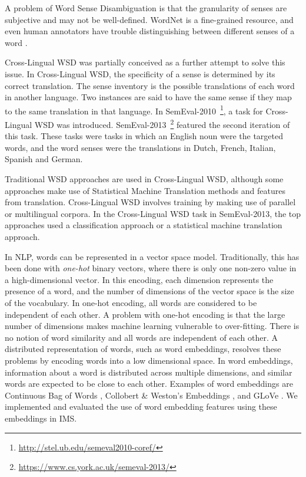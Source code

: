 \documentclass[11pt]{article}
\begin{document}
A problem of Word Sense Disambiguation is that the granularity of senses are subjective and may not be well-defined. WordNet is a fine-grained resource, and even human annotators have trouble distinguishing between different senses of a word \cite{edmonds2002introduction}. 

Cross-Lingual WSD was partially conceived as a further attempt to solve this issue. In Cross-Lingual WSD, the specificity of a sense is determined by its correct translation. The sense inventory is the possible translations of each word in another language. Two instances are said to have the same sense if they map to the same translation in that language. In SemEval-2010~\footnote{\url{http://stel.ub.edu/semeval2010-coref/}}, a task for Cross-Lingual WSD was introduced. SemEval-2013~\footnote{\url{https://www.cs.york.ac.uk/semeval-2013/}} featured the second iteration of this task. These tasks were tasks in which an English noun were the targeted words, and the word senses were the translations in Dutch, French, Italian, Spanish and German. 


Traditional WSD approaches are used in Cross-Lingual WSD, although some approaches make use of Statistical Machine Translation methods and features from translation. Cross-Lingual WSD involves training by making use of parallel or multilingual corpora. In the Cross-Lingual WSD task in SemEval-2013, the top approaches used a classification approach or a statistical machine translation approach. 

In NLP, words can be represented in a vector space model. Traditionally, this has been done with {\it one-hot} binary vectors, where there is only one non-zero value in a high-dimensional vector. In this encoding, each dimension represents the presence of a word, and the number of dimensions of the vector space is the size of the vocabulary. In one-hot encoding, all words are considered to be independent of each other. A problem with one-hot encoding is that the large number of dimensions makes machine learning vulnerable to over-fitting. There is no notion of word similarity and all words are independent of each other. A distributed representation of words, such as word embeddings, resolves these problems by encoding words into a low dimensional space. In word embeddings, information about a word is distributed across multiple dimensions, and similar words are expected to be close to each other. Examples of word embeddings are Continuous Bag of Words \cite{mikolovword2vec}, Collobert \& Weston's Embeddings \cite{collobert2008unified}, and GLoVe \cite{pennington2014glove}. We implemented and evaluated the use of word embedding features using these embeddings in IMS. 
\end{document}
